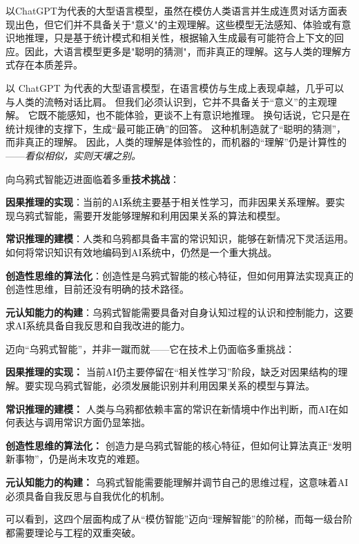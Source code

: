 以ChatGPT为代表的大型语言模型，虽然在模仿人类语言并生成连贯对话方面表现出色，但它们并不具备关于"意义"的主观理解。这些模型无法感知、体验或有意识地推理，只是基于统计模式和相关性，根据输入生成最有可能符合上下文的回应。因此，大语言模型更多是"聪明的猜测"，而非真正的理解。这与人类的理解方式存在本质差异。

以 ChatGPT 为代表的大型语言模型，在语言模仿与生成上表现卓越，几乎可以与人类的流畅对话比肩。
但我们必须认识到，它并不具备关于“意义”的主观理解。
它既不能感知，也不能体验，更谈不上有意识地推理。
换句话说，它只是在统计规律的支撑下，生成“最可能正确”的回答。
这种机制造就了“聪明的猜测”，而非真正的理解。
因此，人类的理解是体验性的，而机器的“理解”仍是计算性的——\emph{看似相似，实则天壤之别。}

向乌鸦式智能迈进面临着多重\textbf{技术挑战}：

\textbf{因果推理的实现}：当前的AI系统主要基于相关性学习，而非因果关系理解。要实现乌鸦式智能，需要开发能够理解和利用因果关系的算法和模型。

\textbf{常识推理的建模}：人类和乌鸦都具备丰富的常识知识，能够在新情况下灵活运用。如何将常识知识有效地编码到AI系统中，仍然是一个重大挑战。

\textbf{创造性思维的算法化}：创造性是乌鸦式智能的核心特征，但如何用算法实现真正的创造性思维，目前还没有明确的技术路径。

\textbf{元认知能力的构建}：乌鸦式智能需要具备对自身认知过程的认识和控制能力，这要求AI系统具备自我反思和自我改进的能力。

迈向“乌鸦式智能”，并非一蹴而就——它在技术上仍面临多重挑战：

\textbf{因果推理的实现：} 当前AI仍主要停留在“相关性学习”阶段，缺乏对因果结构的理解。要实现乌鸦式智能，必须发展能识别并利用因果关系的模型与算法。

\textbf{常识推理的建模：} 人类与乌鸦都依赖丰富的常识在新情境中作出判断，而AI在如何表达与调用常识方面仍显笨拙。

\textbf{创造性思维的算法化：} 创造力是乌鸦式智能的核心特征，但如何让算法真正“发明新事物”，仍是尚未攻克的难题。

\textbf{元认知能力的构建：} 乌鸦式智能需要能理解并调节自己的思维过程，这意味着AI必须具备自我反思与自我优化的机制。

可以看到，这四个层面构成了从“模仿智能”迈向“理解智能”的阶梯，而每一级台阶都需要理论与工程的双重突破。

